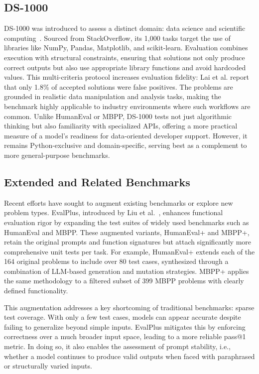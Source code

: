 \subsection{DS-1000}
DS-1000 was introduced to assess a distinct domain: data science and scientific computing~\autocite{Lai2022DS1000}. Sourced from StackOverflow, its 1,000 tasks target the use of libraries like NumPy, Pandas, Matplotlib, and scikit-learn. Evaluation combines execution with structural constraints, ensuring that solutions not only produce correct outputs but also use appropriate library functions and avoid hardcoded values. This multi-criteria protocol increases evaluation fidelity: Lai et al. report that only 1.8\% of accepted solutions were false positives. The problems are grounded in realistic data manipulation and analysis tasks, making the benchmark highly applicable to industry environments where such workflows are common. Unlike HumanEval or \gls{MBPP}, DS-1000 tests not just algorithmic thinking but also familiarity with specialized APIs, offering a more practical measure of a model’s readiness for data-oriented developer support. However, it remains Python-exclusive and domain-specific, serving best as a complement to more general-purpose benchmarks.

\subsection{Extended and Related Benchmarks}
Recent efforts have sought to augment existing benchmarks or explore new problem types. EvalPlus, introduced by Liu et al.~\autocite{Liu2023Rigorous}, enhances functional evaluation rigor by expanding the test suites of widely used benchmarks such as HumanEval and \gls{MBPP}. These augmented variants, HumanEval+ and MBPP+, retain the original prompts and function signatures but attach significantly more comprehensive unit tests per task. For example, HumanEval+ extends each of the 164 original problems to include over 80 test cases, synthesized through a combination of LLM-based generation and mutation strategies. \gls{MBPP}+ applies the same methodology to a filtered subset of 399 \gls{MBPP} problems with clearly defined functionality.

This augmentation addresses a key shortcoming of traditional benchmarks: sparse test coverage. With only a few test cases, models can appear accurate despite failing to generalize beyond simple inputs. EvalPlus mitigates this by enforcing correctness over a much broader input space, leading to a more reliable pass@1 metric. In doing so, it also enables the assessment of prompt stability, i.e., whether a model continues to produce valid outputs when faced with paraphrased or structurally varied inputs.

